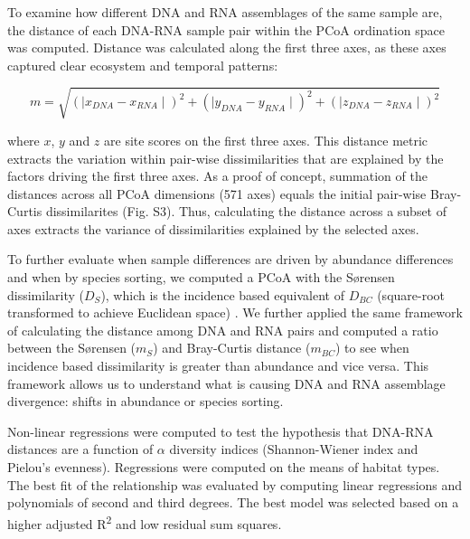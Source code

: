 \documentclass[12pt,a4paper]{article} %
\begin{document}
To examine how different DNA and RNA assemblages of the same sample are, the distance of each DNA-RNA sample pair within the PCoA ordination space was computed. Distance was calculated along the first three axes, as these axes captured clear ecosystem and temporal patterns:

\[ m = \sqrt{(\mid x_{DNA} - x_{RNA} \mid)^2 + (\mid y_{DNA} - y_{RNA} \mid)^2 + (\mid z_{DNA} - z_{RNA} \mid)^2}\]

where $x$, $y$ and $z$ are site scores on the first three axes. This distance metric extracts the variation within pair-wise dissimilarities that are explained by the factors driving the first three axes. As a proof of concept, summation of the distances across all PCoA dimensions (571 axes) equals the initial pair-wise Bray-Curtis dissimilarites (Fig. S3). Thus, calculating the distance across a subset of axes extracts the variance of dissimilarities explained by the selected axes.

To further evaluate when sample differences are driven by abundance differences and when by species sorting, we computed a PCoA with the S{\o}rensen dissimilarity ($D_{S}$), which is the incidence based equivalent of $D_{BC}$ (square-root transformed to achieve Euclidean space) \citep{Sorensen1948, Legendre1998}. We further applied the same framework of calculating the distance among DNA and RNA pairs and computed a ratio between the S{\o}rensen ($m_S$) and Bray-Curtis distance ($m_{BC}$) to see when incidence based dissimilarity is greater than abundance and vice versa. This framework allows us to understand what is causing DNA and RNA assemblage divergence: shifts in abundance or species sorting.

Non-linear regressions were computed to test the hypothesis that DNA-RNA distances are a function of $\alpha$ diversity indices (Shannon-Wiener index and Pielou's evenness). Regressions were computed on the means of habitat types. The best fit of the relationship was evaluated by computing linear regressions and polynomials of second and third degrees. The best model was selected based on a higher adjusted R\textsuperscript{2} and low residual sum squares.
\end{document}
